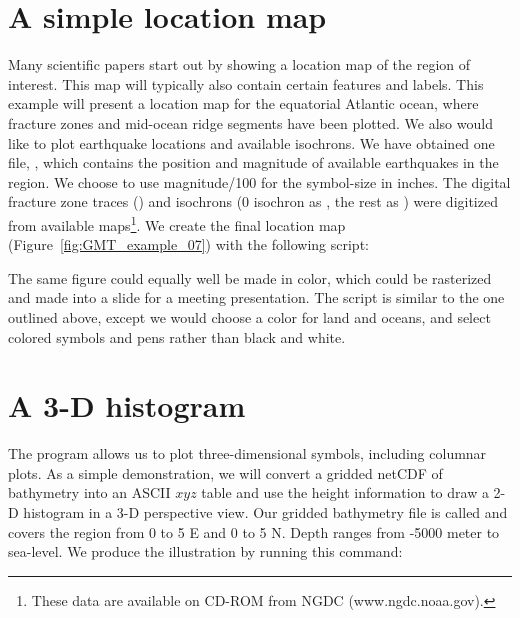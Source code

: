 \section{A simple location map}

Many scientific papers start out by showing a location map
of the region of interest. This map will typically also
contain certain features and labels.  This example will
present a location map for the equatorial Atlantic ocean,
where fracture zones and mid-ocean ridge segments have been
plotted.  We also would like to plot earthquake locations
and available isochrons.  We have obtained one file,
, which contains the position and magnitude of
available earthquakes in the region.  We choose to use
magnitude/100 for the symbol-size in inches.  The digital
fracture zone traces () and isochrons (0 isochron as
, the rest as ) were digitized from
available maps\footnote{These data are available on CD-ROM from NGDC (www.ngdc.noaa.gov).}.
We create the final location map
(Figure~\ref{fig:GMT_example_07}) with the following script:


The same figure could equally well be made in color, which
could be rasterized and made into a slide for a meeting
presentation.  The script is similar to the one outlined
above, except we would choose a color for land and oceans,
and select colored symbols and pens rather than black and white.


\section{A 3-D histogram}

The program  allows us to plot three-dimensional
symbols, including columnar plots.  As a simple demonstration,
we will convert a gridded netCDF of bathymetry into an
ASCII $xyz$ table and use the height information to draw a
2-D histogram in a 3-D perspective view.  Our gridded
bathymetry file is called  and covers the region
from 0 to 5 \DS E and 0 to 5 \DS N.  Depth ranges from
-5000 meter to sea-level.  We produce the illustration by
running this command:


